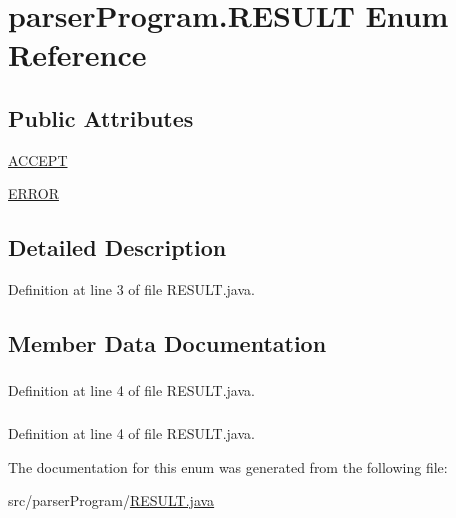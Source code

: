 \hypertarget{enumparser_program_1_1_r_e_s_u_l_t}{\section{parser\-Program.\-R\-E\-S\-U\-L\-T Enum Reference}
\label{enumparser_program_1_1_r_e_s_u_l_t}
}
\subsection*{Public Attributes}
\begin{DoxyCompactItemize}
\item 
\hyperlink{enumparser_program_1_1_r_e_s_u_l_t_a1e9fd6ad602e25983c6104f10c9bbf29}{A\-C\-C\-E\-P\-T}
\item 
\hyperlink{enumparser_program_1_1_r_e_s_u_l_t_ab53193d78e07c487ad5b3a77fc90de3a}{E\-R\-R\-O\-R}
\end{DoxyCompactItemize}


\subsection{Detailed Description}


Definition at line 3 of file R\-E\-S\-U\-L\-T.\-java.



\subsection{Member Data Documentation}
\hypertarget{enumparser_program_1_1_r_e_s_u_l_t_a1e9fd6ad602e25983c6104f10c9bbf29}{
\subsubsection[{A\-C\-C\-E\-P\-T}]{}}\label{enumparser_program_1_1_r_e_s_u_l_t_a1e9fd6ad602e25983c6104f10c9bbf29}


Definition at line 4 of file R\-E\-S\-U\-L\-T.\-java.

\hypertarget{enumparser_program_1_1_r_e_s_u_l_t_ab53193d78e07c487ad5b3a77fc90de3a}{
\subsubsection[{E\-R\-R\-O\-R}]{}}\label{enumparser_program_1_1_r_e_s_u_l_t_ab53193d78e07c487ad5b3a77fc90de3a}


Definition at line 4 of file R\-E\-S\-U\-L\-T.\-java.



The documentation for this enum was generated from the following file\-:\begin{DoxyCompactItemize}
\item 
src/parser\-Program/\hyperlink{_r_e_s_u_l_t_8java}{R\-E\-S\-U\-L\-T.\-java}\end{DoxyCompactItemize}
